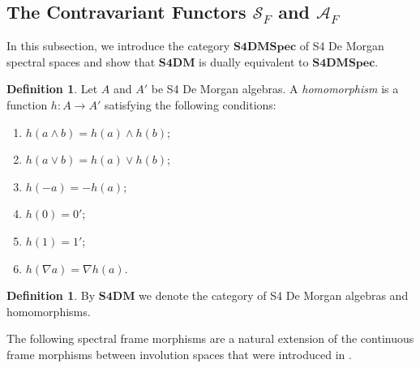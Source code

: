 \documentclass{amsart}
\theoremstyle{plain}
\theoremstyle{definition}
\newtheorem{definition}[theorem]{Definition}
\begin{document}
\subsection{The Contravariant Functors $\mathcal{S}_F$ and $\mathcal{A}_F$}
In this subsection, we introduce the category $\mathbf{S4DMSpec}$ of S4 De Morgan spectral spaces and show that $\mathbf{S4DM}$ is dually equivalent to $\mathbf{S4DMSpec}$. 
\begin{definition}
    Let $A$ and $A'$ be S4 De Morgan algebras. A \emph{homomorphism} is a function $h\colon A\to A'$ satisfying the following conditions: 
    \begin{enumerate}
        \item $h(a\wedge b)=h(a)\wedge h(b)$; 
        \item $h(a\vee b)=h(a)\vee h(b)$; 
        \item $h(-a)=-h(a)$; 
        \item $h(0)=0'$; 
        \item $h(1)=1'$; 
        \item $h(\nabla a)=\nabla h(a)$. 
    \end{enumerate}
\end{definition}
\begin{definition}
    By $\mathbf{S4DM}$ we denote the category of S4 De Morgan algebras and homomorphisms. 
\end{definition}

The following spectral frame morphisms are a natural extension of the continuous frame morphisms between involution spaces that were introduced in \cite{bimbo}. 
\end{document}
